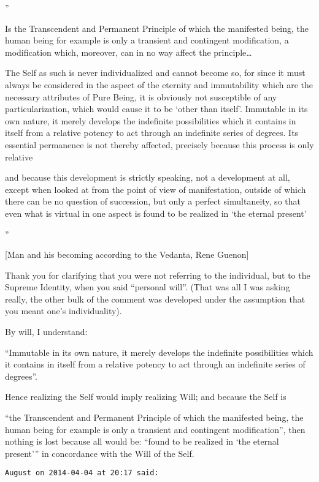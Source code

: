\begin{footnotesize}
\begin{sffamily}
”

Is the Transcendent and Permanent Principle of which the manifested being, the human being for example is only a transient and contingent modification, a modification which, moreover, can in no way affect the principle…

The Self as such is never individualized and cannot become so, for since it must always be considered in the aspect of the eternity and immutability which are the necessary attributes of Pure Being, it is obviously not susceptible of any particularization, which would cause it to be `other than itself'. Immutable in its own nature, it merely develops the indefinite possibilities which it contains in itself from a relative potency to act through an indefinite series of degrees. Its essential permanence is not thereby affected, precisely because this process is only relative

and because this development is strictly speaking, not a development at all, except when looked at from the point of view of manifestation, outside of which there can be no question of succession, but only a perfect simultaneity, so that even what is virtual in one aspect is found to be realized in `the eternal present'

”

[Man and his becoming according to the Vedanta, Rene Guenon]

Thank you for clarifying that you were not referring to the individual, but to the Supreme Identity, when you said “personal will”. (That was all I was asking really, the other bulk of the comment was developed under the assumption that you meant one's individuality).

By will, I understand: 

“Immutable in its own nature, it merely develops the indefinite possibilities which it contains in itself from a relative potency to act through an indefinite series of degrees”.

Hence realizing the Self would imply realizing Will; and because the Self is

“the Transcendent and Permanent Principle of which the manifested being, the human being for example is only a transient and contingent modification”, then nothing is lost because all would be: “found to be realized in `the eternal present'” in concordance with the Will of the Self.


\hfill

\texttt{August on 2014-04-04 at 20:17 said: }


\end{sffamily}
\end{footnotesize}
